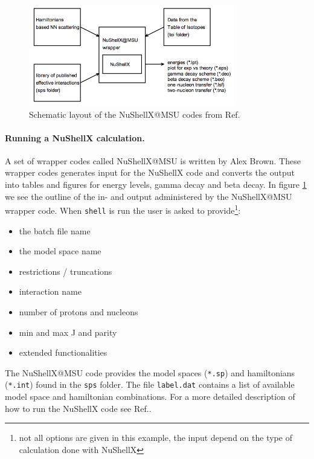 \documentclass[twoside]{article}
\begin{document}
\begin{figure}[ht]
\centering
\includegraphics[width=0.8\textwidth]{nushellX_structure_from_ref.png}
\caption{Schematic layout of the NuShellX@MSU codes from Ref.\cite{ref: nushellx} }
\label{fig: nushellx_struct}
\end{figure}

\paragraph{Running a NuShellX calculation.} A set of wrapper codes called NuShellX@MSU is written by Alex Brown. These wrapper codes generates input for the NuShellX code and converts the output into tables and figures for energy levels, gamma decay and beta decay. In figure \ref{fig: nushellx_struct} we see the outline of the in- and output administered by the NuShellX@MSU wrapper code. When \texttt{shell} is run the user is asked to provide\footnote{not all options are given in this example, the input depend on the type of calculation done with NuShellX}:

\begin{itemize}
\item the batch file name
\item the model space name
\item restrictions / truncations
\item interaction name
\item number of protons and nucleons
\item min and max J and parity
\item extended functionalities
\end{itemize}

The NuShellX@MSU code provides the model spaces (\texttt{*.sp}) and hamiltonians (\texttt{*.int}) found in the \texttt{sps} folder. The file \texttt{label.dat} contains a list of available model space and hamiltonian combinations. For a more detailed description of how to run the NuShellX code see Ref.\cite{help_file}.
\end{document}
